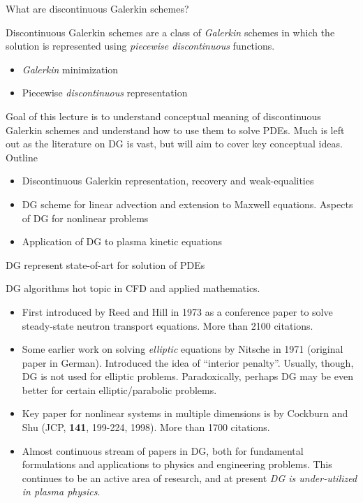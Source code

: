 \documentclass[aspectratio=169]{beamer}
\newcommand{\mypause}{\pause}
\begin{document}
\begin{frame}{What are discontinuous Galerkin schemes?}

  \begin{block}{}
    Discontinuous Galerkin schemes are a class of \emph{Galerkin}
    schemes in which the solution is represented using \emph{piecewise
      discontinuous} functions.
  \end{block}
  \mypause
  \begin{itemize}
    \item \emph{Galerkin} minimization
    \item Piecewise \emph{discontinuous} representation
  \end{itemize}
  \mypause
  Goal of this lecture is to understand conceptual meaning of
  discontinuous Galerkin schemes and understand how to use them to
  solve PDEs. Much is left out as the literature on DG is vast, but
  will aim to cover key conceptual ideas. Outline

  \begin{itemize}
  \item Discontinuous Galerkin representation, recovery and
    weak-equalities
  \item DG scheme for linear advection and extension to Maxwell
    equations. Aspects of DG for nonlinear problems
  \item Application of DG to plasma kinetic equations
  \end{itemize}  
  
\end{frame}  

\begin{frame}{DG represent state-of-art for solution of PDEs}

  DG algorithms hot topic in CFD and applied mathematics.
  \begin{itemize}
    \small
  \item First introduced by Reed and Hill in 1973 as a conference
    paper to solve steady-state neutron transport equations. More than
    2100 citations. \mypause
  \item Some earlier work on solving \emph{elliptic} equations by
    Nitsche in 1971 (original paper in German). Introduced the idea of
    ``interior penalty''. Usually, though, DG is not used for elliptic
    problems. Paradoxically, perhaps DG may be even better for certain
    elliptic/parabolic problems. \mypause
  \item Key paper for nonlinear systems in multiple dimensions is by
    Cockburn and Shu (JCP, {\bf 141}, 199-224, 1998). More than 1700
    citations. \mypause
  \item Almost continuous stream of papers in DG, both for fundamental
    formulations and applications to physics and engineering
    problems. This continues to be an active area of research, and at
    present \emph{DG is under-utilized in plasma physics}.
  \end{itemize}

\end{frame}
\end{document}
